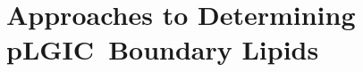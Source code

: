 \documentclass[12pt]{ruthesis_nofloat}
\newcommand{\nachr}{nAChR}
\newcommand{\plgic}{pLGIC}
\begin{document}

%

\section{Approaches to Determining \plgic~Boundary Lipids}
\end{document}
